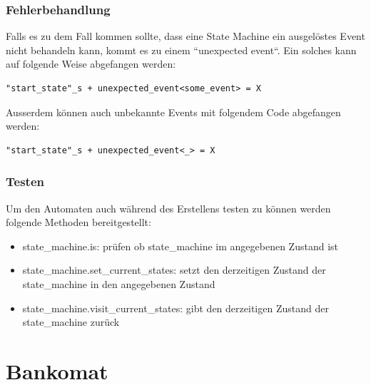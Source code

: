 \documentclass{report}
\begin{document}
\subsection{Fehlerbehandlung}
Falls es zu dem Fall kommen sollte, dass eine State Machine ein ausgelöstes Event nicht behandeln kann, kommt es zu einem ``unexpected event``. Ein solches kann auf folgende Weise abgefangen werden: 
\begin{lstlisting}
"start_state"_s + unexpected_event<some_event> = X
\end{lstlisting}
Ausserdem können auch unbekannte Events mit folgendem Code abgefangen werden:
\begin{lstlisting}
"start_state"_s + unexpected_event<_> = X
\end{lstlisting}
\subsection{Testen}
Um den Automaten auch während des Erstellens testen zu können werden folgende Methoden bereitgestellt:
\begin{itemize}
    \item state\_machine.is: prüfen ob state\_machine im angegebenen Zustand ist
    \item state\_machine.set\_current\_states: setzt den derzeitigen Zustand der state\_machine in den angegebenen Zustand
    \item state\_machine.visit\_current\_states: gibt den derzeitigen Zustand der state\_machine zurück
\end{itemize}

































\chapter{Bankomat}
\end{document}
